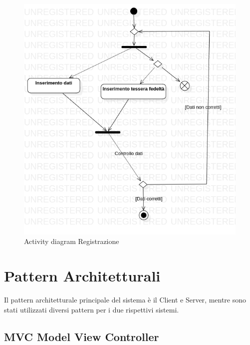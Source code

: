 \documentclass[12pt, a4paper]{report}
\begin{document}
\begin{figure}[h]
  \centering
  \includegraphics[width=\textwidth]{Use Case Model!Registrazione!ActivityRegistrazione!ActivityDiagramRegistrazione_2.png}
  \caption{Activity diagram Registrazione}
\end{figure}

\newpage

\section{Pattern Architetturali}

Il pattern architetturale principale del sistema è il Client e Server, mentre
sono stati utilizzati diversi pattern per i due rispettivi sistemi.

\subsection{MVC Model View Controller}
\end{document}
